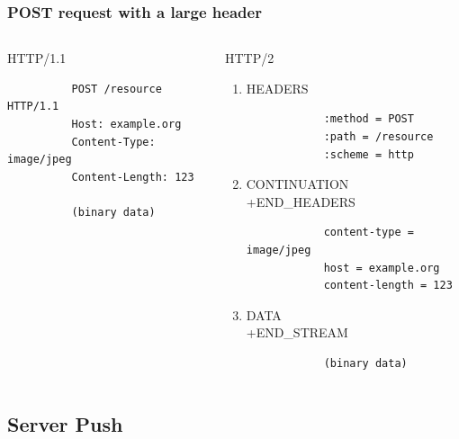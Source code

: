 \documentclass[lualatex]{beamer}
\begin{document}
\begin{frame}[fragile]
  \frametitle{POST request with a large header}

  \begin{columns}[t]
    \begin{column}{.45\textwidth}
      \begin{block}{HTTP/1.1}
        \begin{verbatim}
          POST /resource HTTP/1.1
          Host: example.org
          Content-Type: image/jpeg
          Content-Length: 123
          
          (binary data)
        \end{verbatim}
      \end{block}
    \end{column}
    \begin{column}{.45\textwidth}
      \begin{block}{HTTP/2}
        \begin{enumerate}
        \item HEADERS
          \begin{verbatim}
            :method = POST
            :path = /resource
            :scheme = http
          \end{verbatim}
        \item CONTINUATION\\+END\_HEADERS
          \begin{verbatim}
            content-type = image/jpeg
            host = example.org
            content-length = 123
          \end{verbatim}
        \item DATA\\+END\_STREAM
          \begin{verbatim}
            (binary data)
          \end{verbatim}
        \end{enumerate}
      \end{block}
    \end{column}
  \end{columns}
\end{frame}

\subsection{Server Push}
\end{document}
